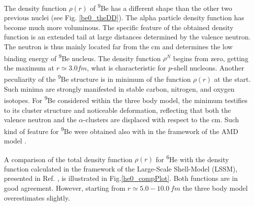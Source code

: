 \documentclass[
12pt, %
oneside, %
english, %
onehalfspacing, %
onehalfspacing, %
headsepline, %
]{MastersDoctoralThesis} %
\newcommand{\he}{\textsuperscript{6}He\xspace}
\newcommand{\be}{\textsuperscript{9}Be\xspace}
\begin{document}
The density function $\rho(r)$ of \be has a different shape than the other two previous nuclei (see Fig. \ref{be0_theDD}). The alpha particle density function has become much more voluminous. 
The specific feature of the obtained density function is an extended tail at large distances determined by the valence neutron. The neutron is thus mainly located far from the cm and determines the low binding energy of \be nucleus.
The density function $\rho^N$ begins from zero, getting the maximum at $r\simeq 3.0 fm$, what is characteristic for $p$-shell nucleons.
Another peculiarity of the \be structure is in minimum of the function $\rho(r)$ at the start. 
Such minima are strongly manifested in stable carbon, nitrogen,
and oxygen isotopes. For \be considered
within the three body model, the minimum testifies to its
cluster structure and noticeable deformation, reflecting that both the valence neutron and the $\alpha$-clusters are
displaced with respect to the cm.
 Such kind of feature for \be were obtained also with in the framework of the AMD model \cite{hirai2011clustering}. 

A comparison of the total density function $\rho(r)$ for \he with the density function calculated in the framework of the Large-Scale Shell-Model (LSSM), presented in Ref. \cite{antonov2005charge}, is illustrated in Fig.\ref{he0_compPlot}. Both functions are in good agreement. However, starting from $r \simeq 5.0-10.0~fm$ the three body model overestimates slightly. 
\end{document}
